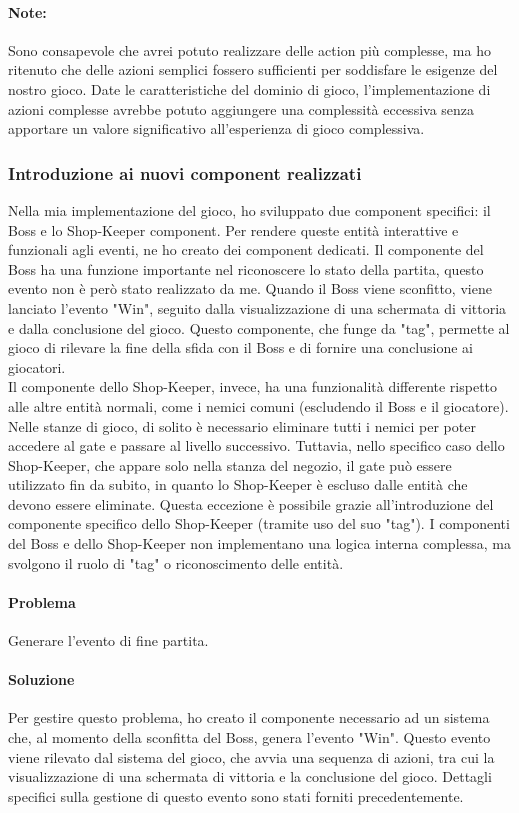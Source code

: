 \documentclass[a4paper,12pt]{report}
\begin{document}
\paragraph*{Note:}
Sono consapevole che avrei potuto realizzare delle action più complesse, ma ho ritenuto che delle azioni semplici fossero sufficienti per soddisfare le esigenze del nostro gioco.
Date le caratteristiche del dominio di gioco, l'implementazione di azioni complesse avrebbe potuto aggiungere una complessità eccessiva senza apportare un valore significativo all'esperienza di gioco complessiva.
\subsubsection*{Introduzione ai nuovi component realizzati}
Nella mia implementazione del gioco, ho sviluppato due component specifici: il Boss e lo Shop-Keeper component.
Per rendere queste entità interattive e funzionali agli eventi, ne ho creato dei component dedicati.
Il componente del Boss ha una funzione importante nel riconoscere lo stato della partita, questo evento non è però stato realizzato da me.
Quando il Boss viene sconfitto, viene lanciato l'evento "Win", seguito dalla visualizzazione di una schermata di vittoria e dalla conclusione del gioco.
Questo componente, che funge da "tag", permette al gioco di rilevare la fine della sfida con il Boss e di fornire una conclusione ai giocatori.
\\
Il componente dello Shop-Keeper, invece, ha una funzionalità differente rispetto alle altre entità normali, come i nemici comuni (escludendo il Boss e il giocatore).
Nelle stanze di gioco, di solito è necessario eliminare tutti i nemici per poter accedere al gate e passare al livello successivo.
Tuttavia, nello specifico caso dello Shop-Keeper, che appare solo nella stanza del negozio, il gate può essere utilizzato fin da subito, in quanto lo Shop-Keeper è escluso dalle entità che devono essere eliminate.
Questa eccezione è possibile grazie all'introduzione del componente specifico dello Shop-Keeper (tramite uso del suo "tag").
I componenti del Boss e dello Shop-Keeper non implementano una logica interna complessa, ma svolgono il ruolo di "tag" o riconoscimento delle entità.
\paragraph*{Problema}
Generare l'evento di fine partita.
\paragraph*{Soluzione}
Per gestire questo problema, ho creato il componente necessario ad un sistema che, al momento della sconfitta del Boss, genera l'evento "Win".
Questo evento viene rilevato dal sistema del gioco, che avvia una sequenza di azioni, tra cui la visualizzazione di una schermata di vittoria e la conclusione del gioco.
Dettagli specifici sulla gestione di questo evento sono stati forniti precedentemente.
\end{document}
